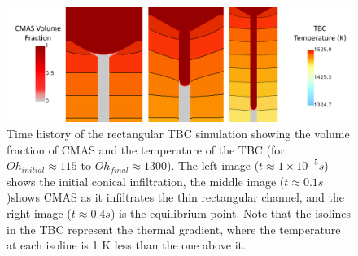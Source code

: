 \documentclass[%
 aip,
 amsmath,amssymb,
 reprint,%
]{revtex4-1}
\begin{document}
\begin{figure}
    \centering
    \includegraphics[width=\linewidth]{Figures/rect_timeHistory.png}
    \caption{Time history of the rectangular TBC simulation showing the volume fraction of CMAS and the temperature of the TBC (for $Oh_{initial} \approx 115$ to $Oh_{final} \approx 1300$). The left image ($t \approx 1\times 10^{-5}s$) shows the initial conical infiltration, the middle image ($t \approx 0.1 s$)shows CMAS as it infiltrates the thin rectangular channel, and the right image ($t \approx 0.4 s$) is the equilibrium point. Note that the isolines in the TBC represent the thermal gradient, where the temperature at each isoline is 1 K less than the one above it.}
    \label{fig:rect_timehistory}
\end{figure}



\end{document}

